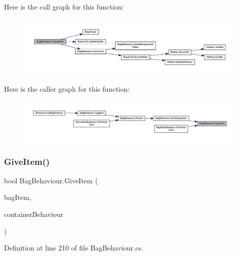 Here is the call graph for this function\+:
\nopagebreak
\begin{figure}[H]
\begin{center}
\leavevmode
\includegraphics[width=350pt]{class_bag_behaviour_a472cbdd4764a3f7980c19d83b3789651_cgraph}
\end{center}
\end{figure}
Here is the caller graph for this function\+:
\nopagebreak
\begin{figure}[H]
\begin{center}
\leavevmode
\includegraphics[width=350pt]{class_bag_behaviour_a472cbdd4764a3f7980c19d83b3789651_icgraph}
\end{center}
\end{figure}
\mbox{\label{class_bag_behaviour_ac72b22f2f0340663e461c4a10f33281d}} 
\subsubsection{\texorpdfstring{GiveItem()}{GiveItem()}}
{\footnotesize\ttfamily bool Bag\+Behaviour.\+Give\+Item (\begin{DoxyParamCaption}\item[{\mbox{\hyperlink{class_bag_item_behaviour}{Bag\+Item\+Behaviour}}}]{bag\+Item,  }\item[{\mbox{\hyperlink{class_container_behaviour}{Container\+Behaviour}}}]{container\+Behaviour }\end{DoxyParamCaption})}



Definition at line 210 of file Bag\+Behaviour.\+cs.

